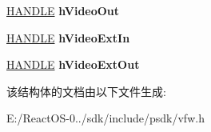 \begin{DoxyCompactItemize}
\hyperlink{interfacevoid}{H\+A\+N\+D\+LE} {\bfseries h\+Video\+Out}
\item 
\mbox{\label{structtag_cap_driver_caps_a2dcf7b26c6c1cb932a8ee0f0b0499b98}} 
\hyperlink{interfacevoid}{H\+A\+N\+D\+LE} {\bfseries h\+Video\+Ext\+In}
\item 
\mbox{\label{structtag_cap_driver_caps_ab816d8675d756bc82b85de6a3b3a1649}} 
\hyperlink{interfacevoid}{H\+A\+N\+D\+LE} {\bfseries h\+Video\+Ext\+Out}
\end{DoxyCompactItemize}


该结构体的文档由以下文件生成\+:\begin{DoxyCompactItemize}
\item 
E\+:/\+React\+O\+S-\/0../sdk/include/psdk/vfw.\+h\end{DoxyCompactItemize}
